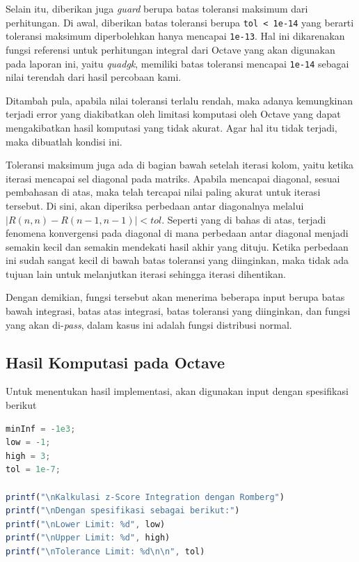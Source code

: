 \documentclass[journal,12pt,onecolumn,a4paper]{IEEEtran}
\begin{document}
Selain itu, diberikan juga \emph{guard} berupa batas toleransi maksimum dari perhitungan. Di awal, diberikan batas toleransi berupa \lstinline{tol < 1e-14} yang berarti toleransi maksimum diperbolehkan hanya mencapai \lstinline{1e-13}. Hal ini dikarenakan fungsi referensi untuk perhitungan integral dari Octave yang akan digunakan pada laporan ini, yaitu \emph{quadgk}, memiliki batas toleransi mencapai \lstinline{1e-14} sebagai nilai terendah dari hasil percobaan kami.

Ditambah pula, apabila nilai toleransi terlalu rendah, maka adanya kemungkinan terjadi error yang diakibatkan oleh limitasi komputasi oleh Octave yang dapat mengakibatkan hasil komputasi yang tidak akurat. Agar hal itu tidak terjadi, maka dibuatlah kondisi ini.

Toleransi maksimum juga ada di bagian bawah setelah iterasi kolom, yaitu ketika iterasi mencapai sel diagonal pada matriks. Apabila mencapai diagonal, sesuai pembahasan di atas, maka telah tercapai nilai paling akurat untuk iterasi tersebut. Di sini, akan diperiksa perbedaan antar diagonalnya melalui \(|R(n,n)-R(n-1,n-1)| < tol\). Seperti yang di bahas di atas, terjadi fenomena konvergensi pada diagonal di mana perbedaan antar diagonal menjadi semakin kecil dan semakin mendekati hasil akhir yang dituju. Ketika perbedaan ini sudah sangat kecil di bawah batas toleransi yang diinginkan, maka tidak ada tujuan lain untuk melanjutkan iterasi sehingga iterasi dihentikan.

Dengan demikian, fungsi tersebut akan menerima beberapa input berupa batas bawah integrasi, batas atas integrasi, batas toleransi yang diinginkan, dan fungsi yang akan di-\emph{pass}, dalam kasus ini adalah fungsi distribusi normal.

\subsection{Hasil Komputasi pada Octave}

Untuk menentukan hasil implementasi, akan digunakan input dengan spesifikasi berikut

\begin{center}
	\begin{lstlisting}[language=Octave]
minInf = -1e3;
low = -1;
high = 3;
tol = 1e-7;

printf("\nKalkulasi z-Score Integration dengan Romberg")
printf("\nDengan spesifikasi sebagai berikut:")
printf("\nLower Limit: %d", low)
printf("\nUpper Limit: %d", high)
printf("\nTolerance Limit: %d\n\n", tol)
	\end{lstlisting}
\end{center}
\end{document}
